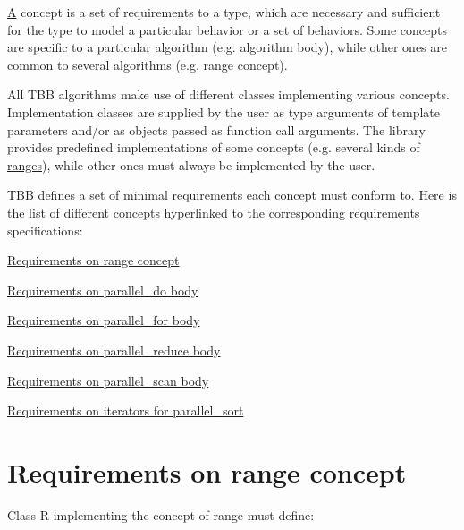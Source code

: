 \hyperlink{structA}{A} concept is a set of requirements to a type, which are necessary and sufficient for the type to model a particular behavior or a set of behaviors. Some concepts are specific to a particular algorithm (e.\+g. algorithm body), while other ones are common to several algorithms (e.\+g. range concept).

All T\+B\+B algorithms make use of different classes implementing various concepts. Implementation classes are supplied by the user as type arguments of template parameters and/or as objects passed as function call arguments. The library provides predefined implementations of some concepts (e.\+g. several kinds of \hyperlink{range_req}{ranges}), while other ones must always be implemented by the user.

T\+B\+B defines a set of minimal requirements each concept must conform to. Here is the list of different concepts hyperlinked to the corresponding requirements specifications\+:
\begin{DoxyItemize}
\item \hyperlink{range_req}{Requirements on range concept}
\item \hyperlink{parallel_do_body_req}{Requirements on parallel\+\_\+do body}
\item \hyperlink{parallel_for_body_req}{Requirements on parallel\+\_\+for body}
\item \hyperlink{parallel_reduce_body_req}{Requirements on parallel\+\_\+reduce body}
\item \hyperlink{parallel_scan_body_req}{Requirements on parallel\+\_\+scan body}
\item \hyperlink{parallel_sort_iter_req}{Requirements on iterators for parallel\+\_\+sort} 
\end{DoxyItemize}\hypertarget{range_req}{}\section{Requirements on range concept}\label{range_req}
Class {\ttfamily R} implementing the concept of range must define\+:
